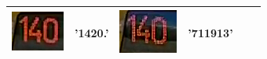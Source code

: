\begin{table}[h!]
\begin{tabular}{ | c | l | c | l | c | l | }
\begin{minipage}{.2\textwidth}
      \includegraphics[width=\textwidth]{img/exp_number_f07}
    \end{minipage}
    &
     '1420.'
    &
    \begin{minipage}{.2\textwidth}
      \includegraphics[width=\textwidth]{img/exp_number_f08}
    \end{minipage}
    &
     '711913'
    &
    &
    \\
    \hline

  \end{tabular}
\end{table}

